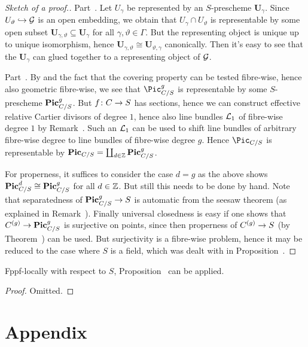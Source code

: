 \documentclass[a4paper,parskip=half,numbers=enddot, DIV=12]{scrreprt}
\begin{document}
\begin{proof}[Sketch of a proof.]
	Part~. Let $U_\gamma$ be represented by an $S$-prescheme $\boldsymbol{U}_\gamma$. Since $U_\vartheta\monomorphism \Gg$ is an open embedding, we obtain that $U_\gamma\cap U_\vartheta$ is representable by some open subset $\boldsymbol{U}_{\gamma,\vartheta}\subseteq \boldsymbol{U}_{\gamma}$ for all $\gamma,\vartheta\in\Gamma$. But the representing object is unique up to unique isomorphism, hence $\boldsymbol{U}_{\gamma,\vartheta}\cong \boldsymbol{U}_{\vartheta,\gamma}$ canonically. Then it's easy to see that the $\boldsymbol{U}_\gamma$ can glued together to a representing object of $\mathcal{G}$.
	
	Part~. By  and the fact that the covering property can be tested fibre-wise, hence also geometric fibre-wise, we see that $\Pic_{C/S}^g$ is representable by some $S$-prescheme $\mathbf{Pic}_{C/S}^g$. But $f\colon C\morphism S$ has sections, hence we can construct  effective relative Cartier divisors of degree $1$, hence also line bundles $\mathcal{L}_1$ of fibre-wise degree $1$ by Remark~. Such an $\mathcal{L}_1$ can be used to shift line bundles of arbitrary fibre-wise degree to line bundles of fibre-wise degree $g$. Hence $\Pic_{C/S}$ is representable by $\mathbf{Pic}_{C/S}=\coprod_{d\in\mathbb{Z}}\mathbf{Pic}_{C/S}^g$.
	
	For properness, it suffices to consider the case $d=g$ as the above shows $\mathbf{Pic}_{C/S}^d\cong \mathbf{Pic}_{C/S}^g$ for all $d\in\mathbb{Z}$. But still this needs to be done by hand. Note that separatedness of $\PIC_{C/S}^g\morphism S$ is automatic from the seesaw theorem (as explained in Remark~). Finally universal closedness is easy if one shows that $C^{(g)}\morphism\PIC_{C/S}^g$ is surjective on points, since then properness of $C^{(g)}\morphism S$ (by Theorem~) can be used. But surjectivity is a fibre-wise problem, hence it may be reduced to the case where $S$ is a field, which was dealt with in Proposition~.
\end{proof}
\begin{prop}
	Fppf-locally with respect to $S$, Proposition~ can be applied.
\end{prop}
\begin{proof}
	Omitted.
\end{proof}


\Appendix
\chapter{Appendix}
\end{document}
